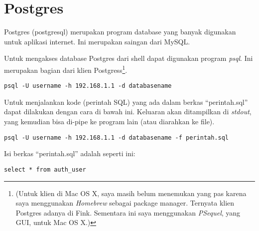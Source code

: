 \chapter{Postgres}
Postgres (postgresql) merupakan program database yang banyak digunakan
untuk aplikasi internet. Ini merupakan saingan dari MySQL.

Untuk mengakses database Postgres dari shell dapat digunakan
program {\em psql}. Ini merupakan bagian dari klien Postgress\footnote{
(Untuk klien di Mac OS X, saya masih belum menemukan yang pas
karena saya menggunakan {\em Homebrew} sebagai
package manager. Ternyata klien Postgres adanya di Fink.
Sementara ini saya menggunakan {\em PSequel}, yang GUI,
untuk Mac OS X.)
}.

\begin{lstlisting}
psql -U username -h 192.168.1.1 -d databasename 
\end{lstlisting}

Untuk menjalankan kode (perintah SQL) yang ada dalam berkas
``perintah.sql'' dapat dilakukan dengan cara di bawah ini.
Keluaran akan ditampilkan di {\em stdout}, yang kemudian bisa
di-pipe ke program lain (atau diarahkan ke file).

\begin{lstlisting}
psql -U username -h 192.168.1.1 -d databasename -f perintah.sql
\end{lstlisting}

Isi berkas ``perintah.sql'' adalah seperti ini:

\begin{lstlisting}
select * from auth_user
\end{lstlisting}
